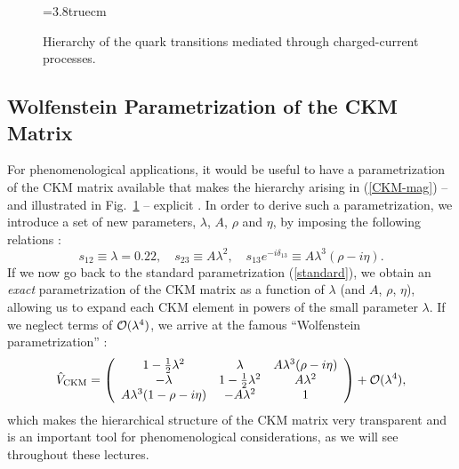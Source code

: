 \documentclass[11pt]{cernrep}
\begin{document}
\begin{figure}
\centerline{
\epsfysize=3.8truecm
}
\vspace*{-0.2truecm}
\caption{Hierarchy of the quark transitions mediated through 
charged-current processes.}\label{fig:term}
\end{figure}


%
%
%
\subsection{Wolfenstein Parametrization of the CKM Matrix}
%
%
%
For phenomenological applications, it would be useful to have a 
parametrization of the CKM matrix available that makes the 
hierarchy arising in (\ref{CKM-mag}) -- and illustrated in
Fig.~\ref{fig:term} -- explicit \cite{wolf}. In order to derive such 
a parametrization, we introduce a set of new parameters, 
$\lambda$, $A$, $\rho$ and $\eta$, by imposing the following 
relations \cite{blo}:
\begin{equation}\label{set-rel}
s_{12}\equiv\lambda=0.22,\quad s_{23}\equiv A\lambda^2,\quad 
s_{13}e^{-i\delta_{13}}\equiv A\lambda^3(\rho-i\eta).
\end{equation}
If we now go back to the standard parametrization (\ref{standard}), we 
obtain an {\it exact} parametrization of the CKM matrix as a function of 
$\lambda$ (and $A$, $\rho$, $\eta$), allowing us to expand each CKM 
element in powers of the small parameter $\lambda$. If we neglect terms of 
${\cal O}(\lambda^4)$, we arrive at the famous ``Wolfenstein 
parametrization'' \cite{wolf}:
\begin{equation}\label{W-par}
\hat V_{\mbox{{\scriptsize CKM}}} =\left(\begin{array}{ccc}
1-\frac{1}{2}\lambda^2 & \lambda & A\lambda^3(\rho-i\eta) \\
-\lambda & 1-\frac{1}{2}\lambda^2 & A\lambda^2\\
A\lambda^3(1-\rho-i\eta) & -A\lambda^2 & 1
\end{array}\right)+{\cal O}(\lambda^4),
\end{equation}
which makes the hierarchical structure of the CKM matrix very transparent 
and is an important tool for phenomenological considerations, as we 
will see throughout these lectures. 
\end{document}
